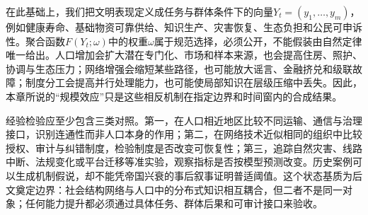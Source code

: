 在此基础上，我们把文明表现定义成任务与群体条件下的向量$Y_t=(y_1,\ldots,y_m)$，例如健康寿命、基础物资可靠供给、知识生产、灾害恢复、生态负担和公民可申诉性。聚合函数$F(Y_t;\omega)$中的权重$\omega$属于规范选择，必须公开，不能假装由自然定律唯一给出。人口增加会扩大潜在专门化、市场和样本来源，也会提高住房、照护、协调与生态压力；网络增强会缩短某些路径，也可能放大谣言、金融挤兑和级联故障；制度分工会提高并行处理能力，也可能使局部知识在层级压缩中丢失。因此，本章所说的“规模效应”只是这些相反机制在指定边界和时间窗内的合成结果。

经验检验应至少包含三类对照。第一，在人口相近地区比较不同运输、通信与治理接口，识别连通性而非人口本身的作用；第二，在网络技术近似相同的组织中比较授权、审计与纠错制度，检验制度是否改变可恢复性；第三，追踪自然灾害、线路中断、法规变化或平台迁移等准实验，观察指标是否按模型预测改变。历史案例可以生成机制假说，却不能凭帝国兴衰的事后叙事证明普适阈值。这个状态基质为后文奠定边界：社会结构网络与人口中的分布式知识相互耦合，但二者不是同一对象；任何能力提升都必须通过具体任务、群体后果和可审计接口来验收。
